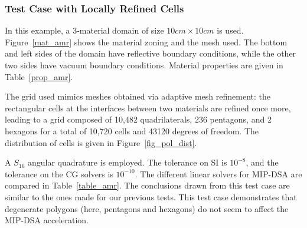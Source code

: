 \documentclass[preprint,10pt]{elsarticle}
\renewcommand{\(}{\left(}
\renewcommand{\)}{\right)}
\renewcommand{\[}{\left[}
\renewcommand{\]}{\right]}
\begin{document}
\subsubsection{Test Case with Locally Refined Cells}

In this example, a 3-material domain of size $10cm\times 10cm$ is used. 
Figure~\ref {mat_amr} shows the material zoning and the mesh used. 
The bottom and left sides of the domain have reflective boundary conditions, while the other 
two sides have vacuum boundary conditions. Material properties 
are given in Table~\ref {prop_amr}.

The grid used mimics meshes obtained via adaptive mesh
refinement: the rectangular cells at the interfaces between two materials are refined once more,
leading to a grid composed of 10,482 quadrilaterals, 236 pentagons,
and 2 hexagons for a total of 10,720 cells and 43120 degrees of freedom. 
The distribution of cells is given in Figure~\ref {fig_pol_dist}.


A $S_{16}$ angular quadrature is employed. The tolerance on SI is $10^{-8}$, and
the tolerance on the CG solvers is $10^{-10}$.
The different linear solvers for MIP-DSA are compared in Table~\ref {table_amr}.
%
The conclusions drawn from this test case are similar to the ones made for 
our previous tests. This test case demonstrates that degenerate polygons 
(here, pentagons and hexagons) do not seem to affect the MIP-DSA acceleration.
\end{document}
